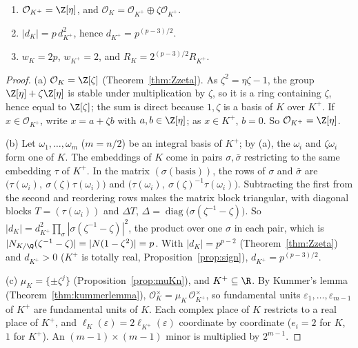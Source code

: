 \begin{proposition}\label{prop:kplus}
\begin{enumerate}[label=(\alph*)]
\item $\mathcal O_{K^+}=\Z[\eta]$, and $\mathcal O_K=\mathcal O_{K^+}\oplus\zeta\mathcal O_{K^+}$.
\item $|d_K|=p\,d_{K^+}^2$, hence $d_{K^+}=p^{(p-3)/2}$.
\item $w_K=2p$, $w_{K^+}=2$, and $R_K=2^{(p-3)/2}R_{K^+}$.
\end{enumerate}
\end{proposition}
\begin{proof}
(a) $\mathcal O_K=\Z[\zeta]$ (Theorem~\ref{thm:Zzeta}). As $\zeta^2=\eta\zeta-1$, the group $\Z[\eta]+\zeta\Z[\eta]$ is stable under multiplication
by $\zeta$, so it is a ring containing $\zeta$, hence equal to $\Z[\zeta]$; the sum is direct because $1,\zeta$ is a basis of $K$ over $K^+$.
If $x\in\mathcal O_{K^+}$, write $x=a+\zeta b$ with $a,b\in\Z[\eta]$; as $x\in K^+$, $b=0$. So $\mathcal O_{K^+}=\Z[\eta]$.

(b) Let $\omega_1,\dots,\omega_m$ ($m=n/2$) be an integral basis of $K^+$; by (a), the $\omega_i$ and $\zeta\omega_i$ form one of $K$. The
embeddings of $K$ come in pairs $\sigma,\bar\sigma$ restricting to the same embedding $\tau$ of $K^+$. In the matrix $(\sigma(\text{basis}))$,
the rows of $\sigma$ and $\bar\sigma$ are $\bigl(\tau(\omega_i),\ \sigma(\zeta)\tau(\omega_i)\bigr)$ and $\bigl(\tau(\omega_i),\
\sigma(\zeta)^{-1}\tau(\omega_i)\bigr)$. Subtracting the first from the second and reordering rows makes the matrix block triangular, with
diagonal blocks $T=(\tau(\omega_i))$ and $\Delta T$, $\Delta=\operatorname{diag}\bigl(\sigma(\zeta^{-1}-\zeta)\bigr)$. So $|d_K|=d_{K^+}^2
\prod_\sigma|\sigma(\zeta^{-1}-\zeta)|^2$, the product over one $\sigma$ in each pair, which is $|N_{K/\Q}(\zeta^{-1}-\zeta)|=|N(1-\zeta^2)|=p$.
With $|d_K|=p^{p-2}$ (Theorem~\ref{thm:Zzeta}) and $d_{K^+}>0$ ($K^+$ is totally real, Proposition~\ref{prop:sign}), $d_{K^+}=p^{(p-3)/2}$.

(c) $\mu_K=\{\pm\zeta^j\}$ (Proposition~\ref{prop:muKn}), and $K^+\subseteq\R$. By Kummer's lemma (Theorem~\ref{thm:kummerlemma}),
$\mathcal O_K^\times=\mu_K\,\mathcal O_{K^+}^\times$, so fundamental units $\varepsilon_1,\dots,\varepsilon_{m-1}$ of $K^+$ are fundamental units of
$K$. Each complex place of $K$ restricts to a real place of $K^+$, and $\ell_K(\varepsilon)=2\ell_{K^+}(\varepsilon)$ coordinate by
coordinate ($e_i=2$ for $K$, $1$ for $K^+$). An $(m-1)\times(m-1)$ minor is multiplied by $2^{m-1}$.
\end{proof}

